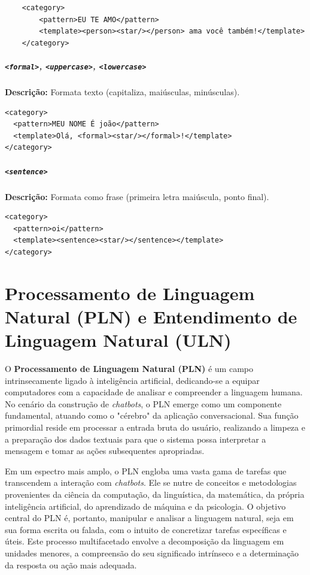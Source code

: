 \documentclass[14pt,a4paper,oneside]{book}
\begin{document}
\begin{verbatim}
	<category>
		<pattern>EU TE AMO</pattern>
		<template><person><star/></person> ama você também!</template>
	</category>
\end{verbatim}

\paragraph{\texttt{<formal>}, \texttt{<uppercase>}, \texttt{<lowercase>}} 

\textbf{Descrição:} Formata texto (capitaliza, maiúsculas, minúsculas). 

\begin{verbatim}
<category>
  <pattern>MEU NOME É joão</pattern>
  <template>Olá, <formal><star/></formal>!</template>
</category>
\end{verbatim}

\paragraph{\texttt{<sentence>}} 

\textbf{Descrição:} Formata como frase (primeira letra maiúscula, ponto final). 

\begin{verbatim}
<category>
  <pattern>oi</pattern>
  <template><sentence><star/></sentence></template>
</category>
\end{verbatim}



\chapter{Processamento de Linguagem Natural (PLN) e Entendimento de Linguagem Natural (ULN)}

O \textbf{Processamento de Linguagem Natural (PLN)} é um campo intrinsecamente ligado à inteligência artificial, dedicando-se a equipar computadores com a capacidade de analisar e compreender a linguagem humana. No cenário da construção de \textit{chatbots}, o PLN emerge como um componente fundamental, atuando como o "cérebro" da aplicação conversacional. Sua função primordial reside em processar a entrada bruta do usuário, realizando a limpeza e a preparação dos dados textuais para que o sistema possa interpretar a mensagem e tomar as ações subsequentes apropriadas.

Em um espectro mais amplo, o PLN engloba uma vasta gama de tarefas que transcendem a interação com \textit{chatbots}. Ele se nutre de conceitos e metodologias provenientes da ciência da computação, da linguística, da matemática, da própria inteligência artificial, do aprendizado de máquina e da psicologia. O objetivo central do PLN é, portanto, manipular e analisar a linguagem natural, seja em sua forma escrita ou falada, com o intuito de concretizar tarefas específicas e úteis. Este processo multifacetado envolve a decomposição da linguagem em unidades menores, a compreensão do seu significado intrínseco e a determinação da resposta ou ação mais adequada.
\end{document}
